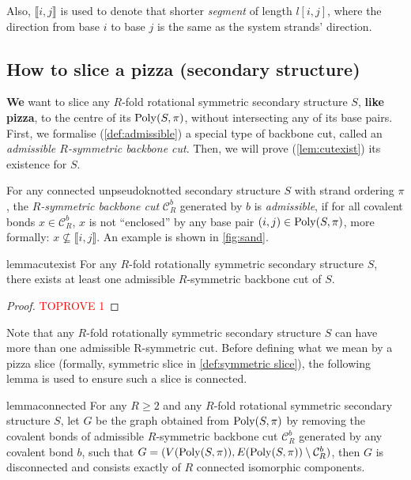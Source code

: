 Also,  $\llbracket i,j \rrbracket$  is used to denote that shorter {\em segment} of length $l[i,j]$, where the direction from base $i$ to base $j$ is the same as the system strands' direction.    

\subsection{How to slice a pizza (secondary structure)}

{\bf We} want to slice any $R$-fold rotational symmetric secondary structure $S$, {\bf like pizza}, to the centre of its $\mathrm{Poly}(S,\pi)$, without intersecting any of its base pairs. First, we formalise (\cref{def:admissible}) a special type of backbone cut, called an \emph{admissible  $R$-symmetric backbone cut}. Then, we will prove (\cref{lem:cutexist}) its existence for $S$. 

\begin{Definition} \label{def:admissible}
	For any connected unpseudoknotted secondary structure $S$ with strand ordering $\pi$, the {\em $R$-symmetric backbone cut} $\mathcal{C}_R^b$ generated by $b$ is {\em admissible}, 
	if for all covalent bonds $x \in \mathcal{C}_R^b$,  
	$x$ is not ``enclosed'' by any base pair $(i,j) \in \mathrm{Poly}(S,\pi)$, more formally:  $x \nsubseteq \llbracket i,j \rrbracket$.   An example is shown in \cref{fig:sand}.
\end{Definition}


\begin{restatable}{lemma}{cutexist} 
	\label{lem:cutexist}
	For any $R$-fold rotationally symmetric secondary structure $S$, there exists at least one admissible $R$-symmetric backbone cut of $S$.
\end{restatable}
\begin{proof}\textcolor{red}{TOPROVE 1}\end{proof}

Note that any $R$-fold rotationally symmetric secondary structure $S$ can have more than one admissible R-symmetric cut. Before defining what we mean by a pizza slice (formally, symmetric slice in \cref{def:symmetric slice}),  the following lemma is used to  ensure such a slice is  connected.

\begin{restatable} {lemma}{connected} 
	\label{lem:connected}
	For any $R\geq 2$ and any $R$-fold rotational symmetric secondary structure $S$, let $G$ be the graph obtained from $\mathrm{Poly}(S,\pi)$ by removing the covalent bonds of admissible $R$-symmetric backbone cut $\mathcal{C}_R^b$ generated by any covalent bond $b$, such that $G=(V(\mathrm{Poly}(S,\pi)), E(\mathrm{Poly}(S,\pi))\setminus\mathcal{C}_R^b)$, then $G$ is disconnected and consists exactly of $R$ connected isomorphic components.
\end{restatable}  





